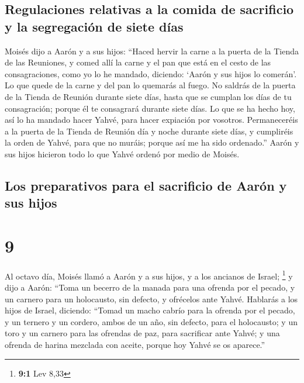 \hypertarget{regulaciones-relativas-a-la-comida-de-sacrificio-y-la-segregaciuxf3n-de-siete-duxedas}{%
\subsection{Regulaciones relativas a la comida de sacrificio y la
segregación de siete
días}\label{regulaciones-relativas-a-la-comida-de-sacrificio-y-la-segregaciuxf3n-de-siete-duxedas}}

 Moisés dijo a Aarón y a sus hijos: ``Haced hervir la
carne a la puerta de la Tienda de las Reuniones, y comed allí la carne y
el pan que está en el cesto de las consagraciones, como yo lo he
mandado, diciendo: `Aarón y sus hijos lo comerán'.  Lo
que quede de la carne y del pan lo quemarás al fuego.  No
saldrás de la puerta de la Tienda de Reunión durante siete días, hasta
que se cumplan los días de tu consagración; porque él te consagrará
durante siete días.  Lo que se ha hecho hoy, así lo ha
mandado hacer Yahvé, para hacer expiación por vosotros. 
Permaneceréis a la puerta de la Tienda de Reunión día y noche durante
siete días, y cumpliréis la orden de Yahvé, para que no muráis; porque
así me ha sido ordenado.''  Aarón y sus hijos hicieron
todo lo que Yahvé ordenó por medio de Moisés.

\hypertarget{los-preparativos-para-el-sacrificio-de-aaruxf3n-y-sus-hijos}{%
\subsection{Los preparativos para el sacrificio de Aarón y sus
hijos}\label{los-preparativos-para-el-sacrificio-de-aaruxf3n-y-sus-hijos}}

\hypertarget{section-8}{%
\section{9}\label{section-8}}

 Al octavo día, Moisés llamó a Aarón y a sus hijos, y a
los ancianos de Israel; \footnote{\textbf{9:1} Lev 8,33} 
y dijo a Aarón: ``Toma un becerro de la manada para una ofrenda por el
pecado, y un carnero para un holocausto, sin defecto, y ofrécelos ante
Yahvé.  Hablarás a los hijos de Israel, diciendo: ``Tomad
un macho cabrío para la ofrenda por el pecado, y un ternero y un
cordero, ambos de un año, sin defecto, para el holocausto;
 y un toro y un carnero para las ofrendas de paz, para
sacrificar ante Yahvé; y una ofrenda de harina mezclada con aceite,
porque hoy Yahvé se os aparece.''

